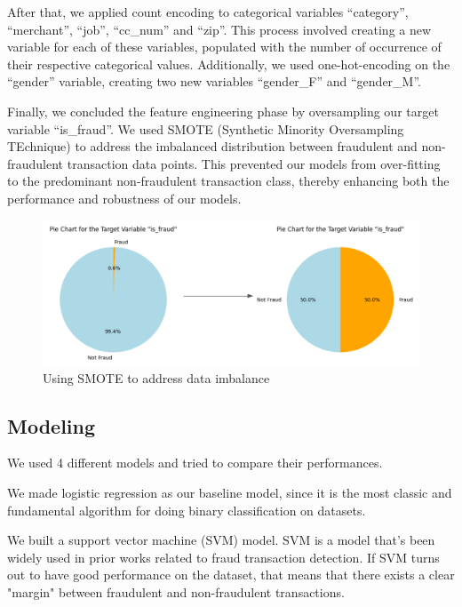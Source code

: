 \documentclass[sigconf, nonacm]{acmart}
\begin{document}
After that, we applied count encoding to categorical variables ``category'', ``merchant'', ``job'', ``cc\_num'' and ``zip''. This process involved creating a new variable for each of these variables, populated with the number of occurrence of their respective categorical values. Additionally, we used one-hot-encoding on the ``gender'' variable, creating two new variables ``gender\_F'' and ``gender\_M''. 

Finally, we concluded the feature engineering phase by oversampling our target variable ``is\_fraud''. We used SMOTE (Synthetic Minority Oversampling TEchnique) to address the imbalanced distribution between fraudulent and non-fraudulent transaction data points. This prevented our models from over-fitting to the predominant non-fraudulent transaction class, thereby enhancing both the performance and robustness of our models.

\begin{figure}[h]
  \centering
  \includegraphics[width=\linewidth]{oversampling.png}
  \caption{Using SMOTE to address data imbalance}
\end{figure}

\subsection{Modeling}

We used 4 different models and tried to compare their performances. 

We made logistic regression as our baseline model, since it is the most classic and fundamental algorithm for doing binary classification on datasets.

We built a support vector machine (SVM) model. SVM is a model that's been widely used in prior works related to fraud transaction detection. If SVM turns out to have good performance on the dataset, that means that there exists a clear "margin" between fraudulent and non-fraudulent transactions. 
\end{document}
